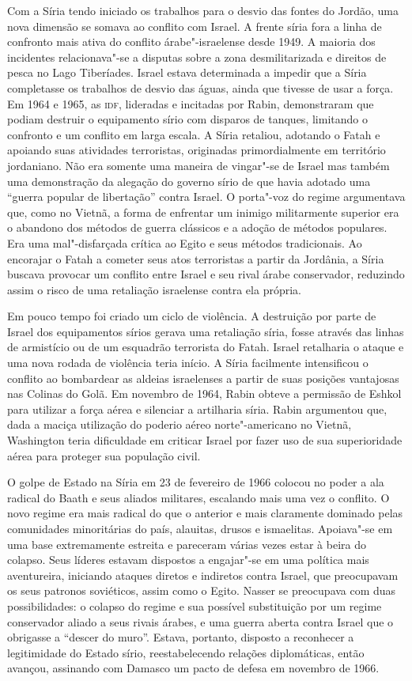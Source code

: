 Com a Síria tendo iniciado os trabalhos para o desvio das fontes
do Jordão, uma nova dimensão se somava ao conflito com Israel. A
frente síria fora a linha de confronto mais ativa do conflito
árabe"-israelense desde 1949. A maioria dos incidentes relacionava"-se a
disputas sobre a zona desmilitarizada e direitos de pesca no Lago
Tiberíades. Israel estava determinada a impedir que a Síria completasse
os trabalhos de desvio das águas, ainda que tivesse de usar a força. Em
1964 e 1965, as \textsc{idf}, lideradas e incitadas por Rabin, demonstraram que
podiam destruir o equipamento sírio com disparos de tanques, limitando
o confronto e um conflito em larga escala. A Síria retaliou,
adotando o Fatah e apoiando suas atividades terroristas, originadas
primordialmente em território jordaniano. Não era somente uma maneira de
vingar"-se de Israel mas também uma demonstração da alegação do governo
sírio de que havia adotado uma ``guerra popular de libertação'' contra
Israel. O porta"-voz do regime argumentava que, como no Vietnã, a forma
de enfrentar um inimigo militarmente superior era o abandono dos métodos
de guerra clássicos e a adoção de métodos populares. Era uma
mal"-disfarçada crítica ao Egito e seus métodos tradicionais. Ao
encorajar o Fatah a cometer seus atos terroristas a partir da Jordânia, a
Síria buscava provocar um conflito entre Israel e seu rival árabe
conservador, reduzindo assim o risco de uma retaliação israelense contra
ela própria.

Em pouco tempo foi criado um ciclo de violência. A destruição por
parte de Israel dos equipamentos sírios gerava uma retaliação síria, fosse
através das linhas de armistício ou de um esquadrão terrorista do Fatah.
Israel retalharia o ataque e uma nova rodada de violência teria início.
A Síria facilmente intensificou o conflito ao bombardear as aldeias
israelenses a partir de suas posições vantajosas nas Colinas do Golã.
Em novembro de 1964, Rabin obteve a permissão de Eshkol para utilizar a
força aérea e silenciar a artilharia síria. Rabin argumentou que, dada a
maciça utilização do poderio aéreo norte"-americano no Vietnã, Washington
teria dificuldade em criticar Israel por fazer uso de sua superioridade
aérea para proteger sua população civil.

O golpe de Estado na Síria em 23 de fevereiro de 1966 colocou no poder a
ala radical do Baath e seus aliados militares, escalando mais uma vez o
conflito. O novo regime era mais radical do que o anterior
e mais claramente dominado pelas comunidades minoritárias do
país, alauitas, drusos e ismaelitas. Apoiava"-se em uma base extremamente
estreita e pareceram várias vezes estar à beira do colapso. Seus líderes
estavam dispostos a engajar"-se em uma política mais aventureira,
iniciando ataques diretos e indiretos contra Israel, que preocupavam os
seus patronos soviéticos, assim como o Egito. Nasser se preocupava com
duas possibilidades: o colapso do regime e sua possível substituição por
um regime conservador aliado a seus rivais árabes, e uma guerra aberta
contra Israel que o obrigasse a ``descer do muro''. Estava, portanto,
disposto a reconhecer a legitimidade do Estado sírio, reestabelecendo
relações diplomáticas, então avançou, assinando com Damasco um pacto de
defesa em novembro de 1966.

